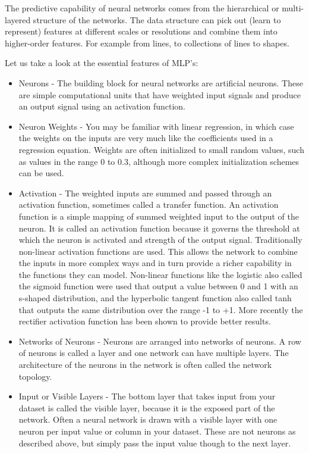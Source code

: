 \documentclass[12pt]{article}
\begin{document}
The predictive capability of neural networks comes from the hierarchical or multi-layered structure of the networks. The data structure can pick out (learn to represent) features at different scales or resolutions and combine them into higher-order features. For example from lines, to collections of lines to shapes.

Let us take a look at the essential features of MLP's:

\begin{itemize}
\item
Neurons - The building block for neural networks are artificial neurons. These are simple computational units that have weighted input signals and produce an output signal using an activation function.

\item
Neuron Weights - You may be familiar with linear regression, in which case the weights on the inputs are very much like the coefficients used in a regression equation. Weights are often initialized to small random values, such as values in the range 0 to 0.3, although more complex initialization schemes can be used.

\item
Activation - The weighted inputs are summed and passed through an activation function, sometimes called a transfer function. An activation function is a simple mapping of summed weighted input to the output of the neuron. It is called an activation function because it governs the threshold at which the neuron is activated and strength of the output signal. Traditionally non-linear activation functions are used. This allows the network to combine the inputs in more complex ways and in turn provide a richer capability in the functions they can model. Non-linear functions like the logistic also called the sigmoid function were used that output a value between 0 and 1 with an s-shaped distribution, and the hyperbolic tangent function also called tanh that outputs the same distribution over the range -1 to +1. More recently the rectifier activation function has been shown to provide better results.

\item
Networks of Neurons - Neurons are arranged into networks of neurons. A row of neurons is called a layer and one network can have multiple layers. The architecture of the neurons in the network is often called the network topology.

\item
Input or Visible Layers - The bottom layer that takes input from your dataset is called the visible layer, because it is the exposed part of the network. Often a neural network is drawn with a visible layer with one neuron per input value or column in your dataset. These are not neurons as described above, but simply pass the input value though to the next layer.


\end{itemize}
\end{document}
